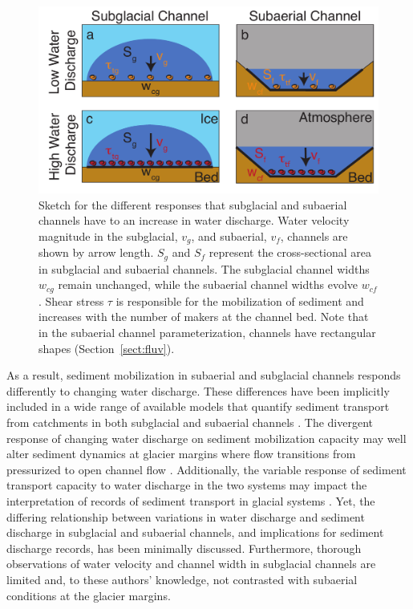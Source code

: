 \documentclass[11pt]{article}
\newcommand{\ian}[1]{{\textbf{\color{blue}Ian says:} \color{blue} #1} }
\begin{document}
  \begin{figure}[h]
  \centering
    \includegraphics[width=0.8\linewidth]{Fig1.pdf}
    \caption{Sketch for the different responses that subglacial and subaerial channels have to an increase in water discharge.  Water velocity magnitude in the subglacial, $v_g$, and subaerial, $v_f$, channels are shown by arrow length. $S_g$ and $S_f$ represent the cross-sectional area in subglacial and subaerial channels. The subglacial channel widths $w_{cg}$ remain unchanged, while the subaerial channel widths evolve $w_{cf}$. Shear stress $\tau$ is responsible for the mobilization of sediment and increases with the number of makers at the channel bed. 
      Note that in the subaerial channel parameterization, channels have rectangular shapes (Section~\ref{sect:fluv}).} 
    \label{fig:cartoon}
  \end{figure}


As a result, sediment mobilization in subaerial and subglacial channels responds differently to changing water discharge.
These differences have been implicitly included in a wide range of available models that  quantify sediment transport from catchments in both subglacial and subaerial channels  \citep[e.g.][]{walder1994,tucker1997,creyts2013,wickert2019,hewitt2019}.
The divergent response of changing water discharge on sediment mobilization capacity may well alter sediment dynamics at glacier margins where flow transitions from pressurized to open channel flow \citep[e.g.][]{lane2016,perolo2018}.
Additionally, the variable response of sediment transport capacity to water discharge in the two systems may impact the interpretation of records of sediment transport in glacial systems \citep[e.g.][]{muller1968,richards2003,swift2005,ganti2016}.
Yet, the differing relationship between variations in water discharge and sediment discharge in subglacial and subaerial channels, and implications for sediment discharge records, has been minimally discussed.
Furthermore, thorough observations of water velocity and channel width in subglacial channels are limited and, to these authors' knowledge, not contrasted with subaerial conditions at the glacier margins. 
\end{document}

